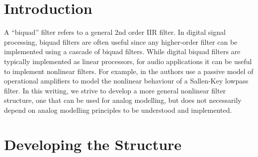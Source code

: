 \documentclass[twoside,a4paper]{article}
\title{\papertitle}
\affiliation{
\paperauthorA \,}
{\href{http://ccrma.stanford.edu}{Center for Computer Research in Music and Acoustics} \\ Stanford University \\ Palo Alto, CA \\ {\tt \href{mailto:jatin@ccrma.stanford.edu}{jatin@ccrma.stanford.edu}}}
\newif\ifpdf
\begin{document}
\ifpdf %
  \DeclareGraphicsExtensions{.png,.jpg,.pdf}
\else  %
\fi

\maketitle

\begin{abstract}
Biquad filters are a common tool for filter design. In this
writing, we develop a structure for creating nonlinear biquad
filters with guaranteed stability. We examine an example filter
designed with this structure, and compare to a corresponding
analog filter.
\end{abstract}

\section{Introduction}
A ``biquad'' filter refers to a general 2nd order IIR filter.
In digital signal processing, biquad filters are often useful
since any higher-order filter can be implemented using a cascade
of biquad filters. While digital biquad filters are typically implemented
as linear processors, for audio applications it can be useful to
implement nonlinear filters. For example, in \cite{SKF} the authors
use a passive model of operational amplifiers to model the nonlinear
behaviour of a Sallen-Key lowpass filter. In this writing, we strive
to develop a more general nonlinear filter structure, one that can be
used for analog modelling, but does not necessarily depend on analog
modelling principles to be understood and implemented.

\section{Developing the Structure}
\end{document}
